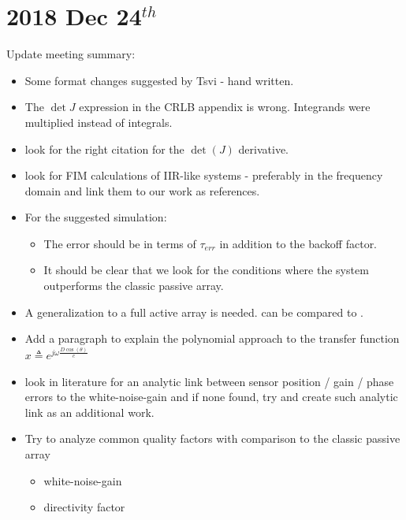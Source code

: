 \documentclass[12pt]{article}
\begin{document}
\section{2018 Dec 24$^{th}$}
Update meeting summary:
\begin{itemize}
    \item Some format changes suggested by Tsvi - hand written.
    \item The $ \det{J} $ expression in the CRLB appendix is wrong. Integrands were multiplied instead of integrals.
    \item look for the right citation for the $\det(J)$ derivative.
    \item look for FIM calculations of IIR-like systems - preferably in the frequency domain and link them to our work as references.
    \item For the suggested simulation:
    \begin{itemize}
        \item The error should be in terms of $\tau_{err}$ in addition to the backoff factor.
        \item It should be clear that we look for the conditions where the system outperforms the classic passive array.
    \end{itemize}
    \item A generalization to a full active array is needed. can be compared to \cite{Chiriac2010ZivSystems}.
    \item Add a paragraph to explain the polynomial approach to the transfer function $ x \triangleq e^{j\omega{\frac{D\cos(\theta)}{c}}} $
    \item look in literature for an analytic link between sensor position / gain / phase errors to the white-noise-gain and if none found, try and create such analytic link as an additional work.
    \item Try to analyze common quality factors with comparison to the classic passive array
    \begin{itemize}
        \item white-noise-gain
        \item directivity factor
    \end{itemize}
\end{itemize}
\end{document}
